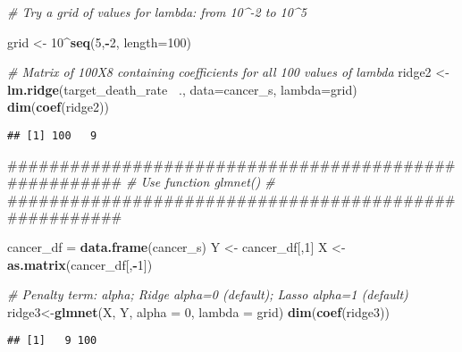\documentclass[]{article}
\newenvironment{Shaded}{\begin{snugshade}}{\end{snugshade}}
\newcommand{\KeywordTok}[1]{\textcolor[rgb]{0.13,0.29,0.53}{\textbf{#1}}}
\newcommand{\DataTypeTok}[1]{\textcolor[rgb]{0.13,0.29,0.53}{#1}}
\newcommand{\DecValTok}[1]{\textcolor[rgb]{0.00,0.00,0.81}{#1}}
\newcommand{\StringTok}[1]{\textcolor[rgb]{0.31,0.60,0.02}{#1}}
\newcommand{\CommentTok}[1]{\textcolor[rgb]{0.56,0.35,0.01}{\textit{#1}}}
\newcommand{\OperatorTok}[1]{\textcolor[rgb]{0.81,0.36,0.00}{\textbf{#1}}}
\newcommand{\NormalTok}[1]{#1}
\begin{document}
\begin{Shaded}
\begin{Highlighting}[]
\CommentTok{# Try a grid of values for lambda: from 10^-2 to 10^5}

\NormalTok{grid <-}\StringTok{ }\DecValTok{10}\OperatorTok{^}\KeywordTok{seq}\NormalTok{(}\DecValTok{5}\NormalTok{,}\OperatorTok{-}\DecValTok{2}\NormalTok{, }\DataTypeTok{length=}\DecValTok{100}\NormalTok{)}


\CommentTok{# Matrix of 100X8 containing coefficients for all 100 values of lambda}
\NormalTok{ridge2 <-}\StringTok{ }\KeywordTok{lm.ridge}\NormalTok{(target_death_rate }\OperatorTok{~}\NormalTok{., }\DataTypeTok{data=}\NormalTok{cancer_s, }\DataTypeTok{lambda=}\NormalTok{grid)}
\KeywordTok{dim}\NormalTok{(}\KeywordTok{coef}\NormalTok{(ridge2))}
\end{Highlighting}
\end{Shaded}

\begin{verbatim}
## [1] 100   9
\end{verbatim}

\begin{Shaded}
\begin{Highlighting}[]
\NormalTok{######################################################}
\CommentTok{#            Use function glmnet()                   #}
\NormalTok{######################################################}

\NormalTok{cancer_df =}\StringTok{ }\KeywordTok{data.frame}\NormalTok{(cancer_s)}
\NormalTok{Y <-}\StringTok{ }\NormalTok{cancer_df[,}\DecValTok{1}\NormalTok{]}
\NormalTok{X <-}\StringTok{ }\KeywordTok{as.matrix}\NormalTok{(cancer_df[,}\OperatorTok{-}\DecValTok{1}\NormalTok{])}

\CommentTok{# Penalty term: alpha; Ridge alpha=0 (default); Lasso alpha=1 (default)}
\NormalTok{ridge3<-}\KeywordTok{glmnet}\NormalTok{(X, Y, }\DataTypeTok{alpha =} \DecValTok{0}\NormalTok{, }\DataTypeTok{lambda =}\NormalTok{ grid)}
\KeywordTok{dim}\NormalTok{(}\KeywordTok{coef}\NormalTok{(ridge3))}
\end{Highlighting}
\end{Shaded}

\begin{verbatim}
## [1]   9 100
\end{verbatim}

\begin{Shaded}
\end{Shaded}
\end{document}
